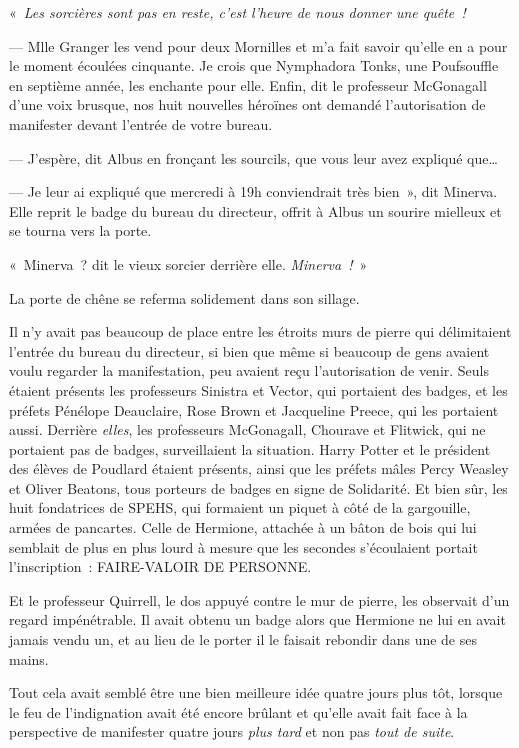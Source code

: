 «~\emph{Les sorcières sont pas en reste, c'est l'heure de nous donner une quête~!}

--- Mlle Granger les vend pour deux Mornilles et m'a fait savoir qu'elle en a pour le moment écoulées cinquante. Je crois que Nymphadora Tonks, une Poufsouffle en septième année, les enchante pour elle. Enfin, dit le professeur McGonagall d'une voix brusque, nos huit nouvelles héroïnes ont demandé l'autorisation de manifester devant l'entrée de votre bureau.

--- J'espère, dit Albus en fronçant les sourcils, que vous leur avez expliqué que…

--- Je leur ai expliqué que mercredi à 19h conviendrait très bien~», dit Minerva. Elle reprit le badge du bureau du directeur, offrit à Albus un sourire mielleux et se tourna vers la porte.

«~Minerva~? dit le vieux sorcier derrière elle. \emph{Minerva~!}~»

La porte de chêne se referma solidement dans son sillage.

\later

Il n'y avait pas beaucoup de place entre les étroits murs de pierre qui délimitaient l'entrée du bureau du directeur, si bien que même si beaucoup de gens avaient voulu regarder la manifestation, peu avaient reçu l'autorisation de venir. Seuls étaient présents les professeurs Sinistra et Vector, qui portaient des badges, et les préfets Pénélope Deauclaire, Rose Brown et Jacqueline Preece, qui les portaient aussi. Derrière \emph{elles}, les professeurs McGonagall, Chourave et Flitwick, qui ne portaient pas de badges, surveillaient la situation. Harry Potter et le président des élèves de Poudlard étaient présents, ainsi que les préfets mâles Percy Weasley et Oliver Beatons, tous porteurs de badges en signe de Solidarité. Et bien sûr, les huit fondatrices de SPEHS, qui formaient un piquet à côté de la gargouille, armées de pancartes. Celle de Hermione, attachée à un bâton de bois qui lui semblait de plus en plus lourd à mesure que les secondes s'écoulaient portait l'inscription~: FAIRE-VALOIR DE PERSONNE.

Et le professeur Quirrell, le dos appuyé contre le mur de pierre, les observait d'un regard impénétrable. Il avait obtenu un badge alors que Hermione ne lui en avait jamais vendu un, et au lieu de le porter il le faisait rebondir dans une de ses mains.

Tout cela avait semblé être une bien meilleure idée quatre jours plus tôt, lorsque le feu de l'indignation avait été encore brûlant et qu'elle avait fait face à la perspective de manifester quatre jours \emph{plus tard} et non pas \emph{tout de suite}.

